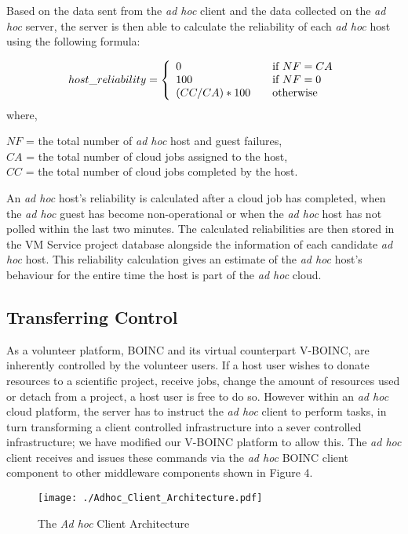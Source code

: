 \documentclass[10pt, conference, compsocconf]{IEEEtran}
\begin{document}
Based on the data sent from the \textit{ad hoc} client and the data collected on the \textit{ad hoc} server, the server is then able to calculate the reliability of each \textit{ad hoc} host using the following formula:

\[ host\_reliability = \left\{ 
  \begin{array}{l l}
     0 & \quad \text{if $NF = CA$}\\
    100 & \quad \text{if $NF = 0$}\\
    (CC/CA)*100 & \quad \text{otherwise}
  \end{array} \right.\]
\noindent where,
\begin{center}$NF$ = the total number of \textit{ad hoc} host and guest failures,\\
$CA$ = the total number of cloud jobs assigned to the host,\\
$CC$ = the total number of cloud jobs completed by the host.
\end{center}

\noindent An \textit{ad hoc} host's reliability is calculated after a cloud job has completed, when the \textit{ad hoc} guest has become non-operational or when the \textit{ad hoc} host has not polled within the last two minutes. The calculated reliabilities are then stored in the VM Service project database alongside the information of each candidate \textit{ad hoc} host. This reliability calculation gives an estimate of the \textit{ad hoc} host's behaviour for the entire time the host is part of the \textit{ad hoc} cloud.

\subsection{Transferring Control}
As a volunteer platform, BOINC and its virtual counterpart V-BOINC, are inherently controlled by the volunteer users. If a host user wishes to donate resources to a scientific project, receive jobs, change the amount of resources used or detach from a project, a host user is free to do so. However within an \textit{ad hoc} cloud platform, the server has to instruct the \textit{ad hoc} client to perform tasks, in turn transforming a client controlled infrastructure into a sever controlled infrastructure; we have modified our V-BOINC platform to allow this. The \textit{ad hoc} client receives and issues these commands via the \textit{ad hoc} BOINC client component to other middleware components shown in Figure 4. 

\begin{figure}[h!]
  \begin{center}
\texttt{[image: ./Adhoc\_Client\_Architecture.pdf]}
  \end{center}
 \caption{The \textit{Ad hoc} Client Architecture}
\end{figure}
\end{document}
